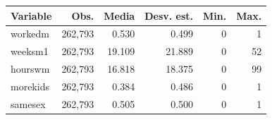 
\begin{tabular}{lrrrrr}
\toprule
Variable & Obs. & Media & Desv. est. & Min. & Max.\\
\midrule
workedm & 262,793 & 0.530 & 0.499 & 0 & 1\\
weeksm1 & 262,793 & 19.109 & 21.889 & 0 & 52\\
hourswm & 262,793 & 16.818 & 18.375 & 0 & 99\\
morekids & 262,793 & 0.384 & 0.486 & 0 & 1\\
samesex & 262,793 & 0.505 & 0.500 & 0 & 1\\
\bottomrule
\end{tabular}
